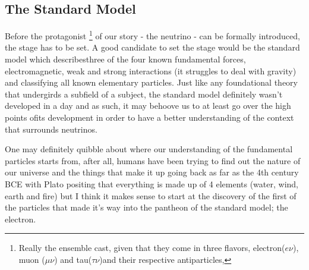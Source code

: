 \subsection{The Standard Model}

Before the protagonist
\footnote{Really the ensemble cast, given that they come in three flavors, electron($e\nu$), muon ($\mu \nu$) and tau($\tau \nu$)and their respective antiparticles,}
of our story - the neutrino - can be formally introduced, the stage has to be set.
A good candidate to set the stage would be the standard model which describesthree of the four known fundamental forces, electromagnetic, weak and strong interactions (it struggles to deal with  gravity) and classifying all known elementary particles.
Just like any foundational theory that undergirds a subfield of a subject, the standard model definitely wasn't developed in a day and as such, it may behoove us to at least go over the high points ofits development in order to have a better understanding of the context that surrounds neutrinos.

One may definitely quibble about where our understanding of the fundamental particles starts from, after all, humans have been trying to find out the nature of our universe and the things that make it up going back as far as the 4th century BCE with Plato positing that everything is made up of 4 elements (water, wind, earth and fire)\cite{Timaeus} but I think it makes sense to start at the discovery of the first of the particles that made it's way into the pantheon of the standard model; the electron.
